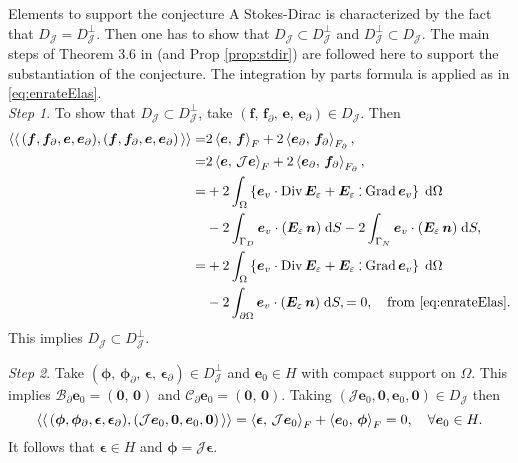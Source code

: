 \begin{paragraph}{Elements to support the conjecture}
	A Stokes-Dirac is characterized by the fact that ${D}_{\mathcal{J}} = {D}_{\mathcal{J}}^\perp$. Then one has to show that ${D}_{\mathcal{J}} \subset {D}_{\mathcal{J}}^\perp$ and ${D}_{\mathcal{J}}^\perp \subset {D}_{\mathcal{J}}$. The main steps of Theorem 3.6 in \cite{legorrec2005} (and Prop \ref{prop:stdir}) are followed here to support the substantiation of the conjecture. The integration by parts formula is applied as in \eqref{eq:enrateElas}. \\
	
	\textit{Step 1}. To show that ${D}_{\mathcal{J}} \subset {D}_{\mathcal{J}}^\perp$, take $(\bm{f}, \, \bm{f}_\partial, \, \bm{e}, \, \bm{e}_\partial) \in {D}_{\mathcal{J}}$. Then
	\begin{align*}
	\bilprod{(\bm{f}, \bm{f}_{\partial}, \bm{e}, \bm{e}_{\partial})}{(\bm{f}, \bm{f}_{\partial}, \bm{e}, \bm{e}_{\partial})} =& 2 \inner[F]{\bm{e}}{\bm{f}} + 2 \inner[F_\partial]{\bm{e}_{\partial}}{\bm{f}_{\partial}}, \\
	=& 2 \inner[F]{\bm{e}}{\mathcal{J}\bm{e}} + 2 \inner[F_\partial]{\bm{e}_{\partial}}{\bm{f}_{\partial}}, \\
	=& + 2 \int_{\Omega} \left\{\bm{e}_v \cdot \Div \bm{E}_\varepsilon + \bm{E}_\varepsilon \cddot \Grad \bm{e}_v \right\}\d\Omega\\
	&- 2 \int_{\Gamma_D} \bm{e}_v \cdot (\bm{E}_\varepsilon \, \bm{n}) \d{S} - 2 \int_{\Gamma_N} \bm{e}_v \cdot (\bm{E}_\varepsilon \, \bm{n}) \d{S}, \\
	=& + 2 \int_{\Omega} \left\{\bm{e}_v \cdot \Div \bm{E}_\varepsilon + \bm{E}_\varepsilon \cddot \Grad \bm{e}_v \right\}\d\Omega\\
	& - 2 \int_{\partial\Omega} \bm{e}_v \cdot (\bm{E}_\varepsilon \, \bm{n}) \d{S},
	= 0, \quad \text{from \eqref{eq:enrateElas}}.
	\end{align*}
	This implies ${D}_{\mathcal{J}} \subset {D}_{\mathcal{J}}^\perp$.
	
	\textit{Step 2}. Take $(\bm{\phi}, \, \bm{\phi}_\partial, \, \bm{\epsilon}, \, \bm{\epsilon}_\partial) \in {D}_{\mathcal{J}}^\perp$ and $\bm{e}_0 \in H$ with compact support on $\Omega$. This implies $\mathcal{B}_\partial \bm{e}_0 = (\bm{0},\, \bm{0})$ and $\mathcal{C}_\partial \bm{e}_0 = (\bm{0},\, \bm{0})$. Taking $(\mathcal{J}\bm{e}_0, \bm{0}, \bm{e}_0, \bm{0}) \in {D}_{\mathcal{J}}$ then 
	\begin{equation*}
	\bilprod{(\bm{\phi}, \bm{\phi}_\partial,  \bm{\epsilon}, \bm{\epsilon}_\partial)}{(\mathcal{J}\bm{e}_0, \bm{0}, \bm{e}_0, \bm{0})} = \inner[F]{\bm{\epsilon}}{\mathcal{J}\bm{e}_0} + \inner[F]{\bm{e}_0}{\bm{\phi}} = 0, \quad \forall \bm{e}_0 \in H.
	\end{equation*}
	It follows that $\bm{\epsilon} \in H$ and $\bm{\phi}=\mathcal{J}\bm{\epsilon}$. \\
	

\end{paragraph}
